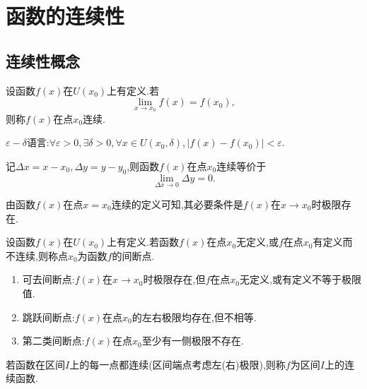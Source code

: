 \chapter{函数的连续性}
\section{连续性概念}
\begin{definition}
    设函数$f(x)$在$U(x_0)$上有定义.若
    \begin{equation}
        \lim_{x\to x_0} f(x)=f(x_0),
    \end{equation}
    则称$f(x)$在点$x_0$连续.
\end{definition}
$\varepsilon - \delta$语言:$\forall \varepsilon>0,\exists \delta>0,\forall x\in U(x_0,\delta),|f(x)-f(x_0)|<\varepsilon.$

记$\Delta x=x-x_0,\Delta y=y-y_0$,则函数$f(x)$在点$x_0$连续等价于\[\lim_{\Delta x\to 0} \Delta y=0.\]

由函数$f(x)$在点$x=x_0$连续的定义可知,其必要条件是$f(x)$在$x\to x_0$时极限存在.
\begin{definition}
    设函数$f(x)$在$U(x_0)$上有定义.若函数$f(x)$在点$x_0$无定义,或$f$在点$x_0$有定义而不连续,则称点$x_0$为函数$f$的间断点.
\end{definition}
\begin{enumerate}
    \item 可去间断点:$f(x)$在$x\to x_0$时极限存在,但$f$在点$x_0$无定义,或有定义不等于极限值.
    \item 跳跃间断点:$f(x)$在点$x_0$的左右极限均存在,但不相等.
    \item 第二类间断点:$f(x)$在点$x_0$至少有一侧极限不存在.
\end{enumerate}

若函数在区间$I$上的每一点都连续(区间端点考虑左(右)极限),则称$f$为区间$I$上的连续函数.

